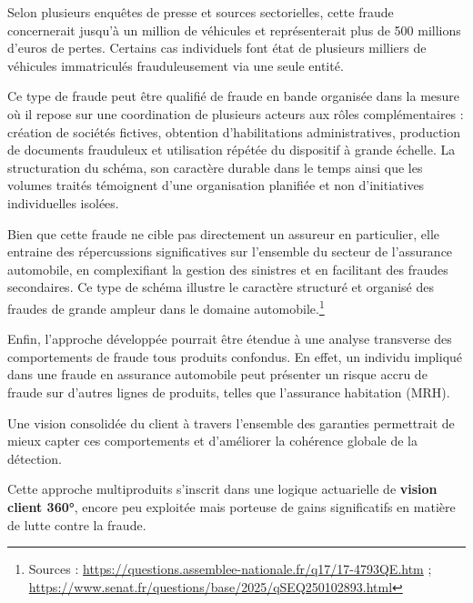 Selon plusieurs enquêtes de presse et sources sectorielles, cette fraude concernerait jusqu'à un million de véhicules et représenterait plus de 500 millions d'euros de pertes. Certains cas individuels font état de plusieurs milliers de véhicules immatriculés frauduleusement via une seule entité.

Ce type de fraude peut être qualifié de fraude en bande organisée dans la mesure où il repose sur une coordination de plusieurs acteurs aux rôles complémentaires : création de sociétés fictives, obtention d'habilitations administratives, production de documents frauduleux et utilisation répétée du dispositif à grande échelle. La structuration du schéma, son caractère durable dans le temps ainsi que les volumes traités témoignent d'une organisation planifiée et non d'initiatives individuelles isolées.

Bien que cette fraude ne cible pas directement un assureur en particulier, elle entraine des répercussions significatives sur l'ensemble du secteur de l'assurance automobile, en complexifiant la gestion des sinistres et en facilitant des fraudes secondaires. Ce type de schéma illustre le caractère structuré et organisé des fraudes de grande ampleur dans le domaine automobile.\footnote{Sources : \url{https://questions.assemblee-nationale.fr/q17/17-4793QE.htm} ; \url{https://www.senat.fr/questions/base/2025/qSEQ250102893.html}}


Enfin, l'approche développée pourrait être étendue à une analyse transverse des comportements de fraude tous produits confondus. En effet, un individu impliqué dans une fraude en assurance automobile peut présenter un risque accru de fraude sur d'autres lignes de produits, telles que l'assurance habitation (MRH).

Une vision consolidée du client à travers l'ensemble des garanties permettrait de mieux capter ces comportements et d'améliorer la cohérence globale de la détection.

Cette approche multiproduits s'inscrit dans une logique actuarielle de \textbf{vision client 360°}, encore peu exploitée mais porteuse de gains significatifs en matière de lutte contre la fraude.